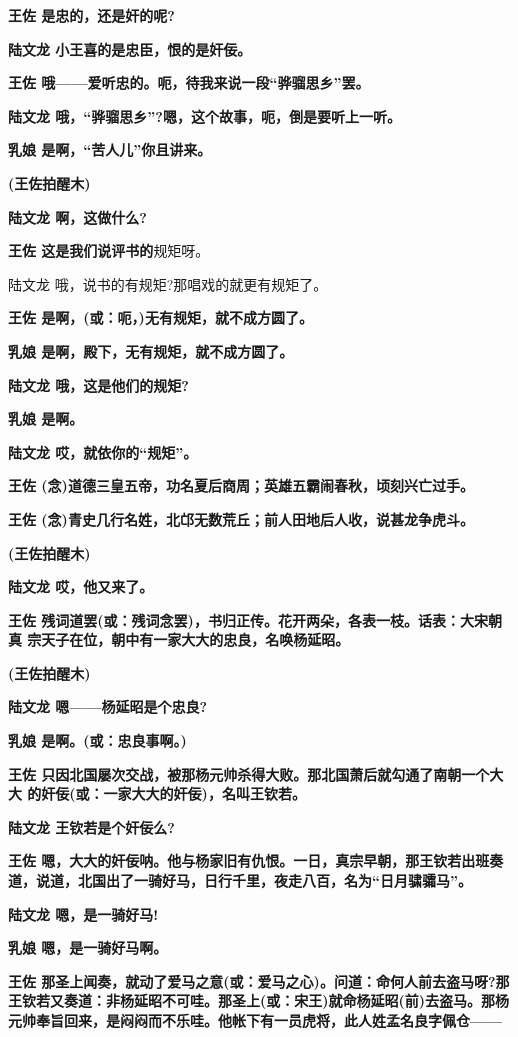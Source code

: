 \textbf{王佐 是忠的，还是奸的呢?}

\textbf{陆文龙 小王喜的是忠臣，恨的是奸佞。}

\textbf{王佐 哦------爱听忠的。呃，待我来说一段``骅骝思乡''罢。}

\textbf{陆文龙 哦，``骅骝思乡''?嗯，这个故事，呃，倒是要听上一听。}

\textbf{乳娘 是啊，``苦人儿''你且讲来。}

\textbf{(王佐拍醒木)}

\textbf{陆文龙 啊，这做什么?}

\textbf{王佐 这是我们说评书的}规矩呀。

陆文龙 哦，说书的有规矩?那唱戏的就更有规矩了。

\textbf{王佐 是啊，(或：呃，)无有规矩，就不成方圆了。}

\textbf{乳娘 是啊，殿下，无有规矩，就不成方圆了。}

\textbf{陆文龙 哦，这是他们的规矩?}

\textbf{乳娘 是啊。}

\textbf{陆文龙 哎，就依你的``规矩''。}

\textbf{王佐
(念)道德三皇五帝，功名夏后商周；英雄五霸闹春秋，顷刻兴亡过手。}

\textbf{王佐
(念)青史几行名姓，北邙无数荒丘；前人田地后人收，说甚龙争虎斗。}

\textbf{(王佐拍醒木)}

\textbf{陆文龙 哎，他又来了。}

\textbf{王佐
残词道罢(或：残词念罢)，书归正传。花开两朵，各表一枝。话表：大宋朝真
宗天子在位，朝中有一家大大的忠良，名唤杨延昭。}

\textbf{(王佐拍醒木)}

\textbf{陆文龙 嗯------杨延昭是个忠良?}

\textbf{乳娘 是啊。(或：忠良事啊。)}

\textbf{王佐
只因北国屡次交战，被那杨元帅杀得大败。那北国萧后就勾通了南朝一个大大
的奸佞(或：一家大大的奸佞)，名叫王钦若。}

\textbf{陆文龙 王钦若是个奸佞么?}

\textbf{王佐
嗯，大大的奸佞呐。他与杨家旧有仇恨。一日，真宗早朝，那王钦若出班奏道，说道，北国出了一骑好马，日行千里，夜走八百，名为``日月骕骦马''。}

\textbf{陆文龙 嗯，是一骑好马!}

\textbf{乳娘 嗯，是一骑好马啊。}

\textbf{王佐
那圣上闻奏，就动了爱马之意(或：爱马之心)。问道：命何人前去盗马呀?那王钦若又奏道：非杨延昭不可哇。那圣上(或：宋王)就命杨延昭(前)去盗马。那杨元帅奉旨回来，是闷闷而不乐哇。他帐下有一员虎将，此人姓孟名良字佩仓------}

